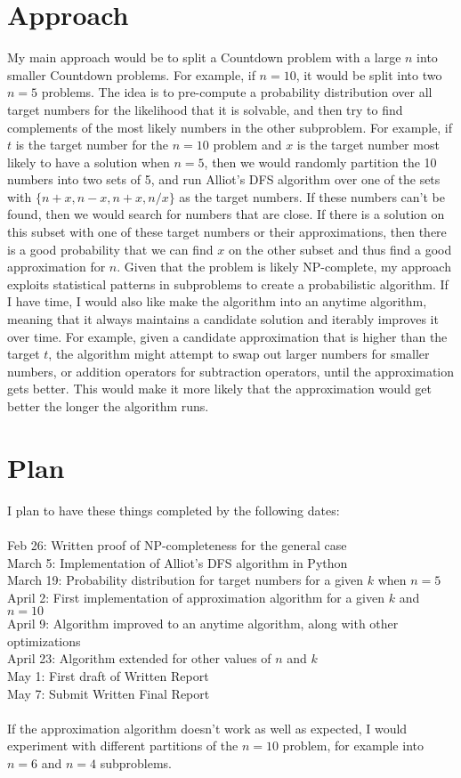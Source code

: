 \documentclass[12pt]{article}
\begin{document}
\section*{Approach}
My main approach would be to split a Countdown problem with a large $n$ into smaller Countdown problems. For example, if $n=10$, it would be split into two $n=5$ problems. The idea is to pre-compute a probability distribution over all target numbers for the likelihood that it is solvable, and then try to find complements of the most likely numbers in the other subproblem. For example, if $t$ is the target number for the $n=10$ problem and $x$ is the target number most likely to have a solution when $n=5$, then we would randomly partition the 10 numbers into two sets of 5, and run Alliot's DFS algorithm \cite{J-M Alliot} over one of the sets with $\{n+x, n-x, n+x, n/x\}$ as the target numbers. If these numbers can't be found, then we would search for numbers that are close. If there is a solution on this subset with one of these target numbers or their approximations, then there is a good probability that we can find $x$ on the other subset and thus find a good approximation for $n$. Given that the problem is likely NP-complete, my approach exploits statistical patterns in subproblems to create a probabilistic algorithm. If I have time, I would also like make the algorithm into an anytime algorithm, meaning that it always maintains a candidate solution and iterably improves it over time. For example, given a candidate approximation that is higher than the target $t$, the algorithm might attempt to swap out larger numbers for smaller numbers, or addition operators for subtraction operators, until the approximation gets better. This would make it more likely that the approximation would get better the longer the algorithm runs. 

\section*{Plan}
I plan to have these things completed by the following dates: \\ \\
Feb 26: Written proof of NP-completeness for the general case \\
March 5: Implementation of Alliot's DFS algorithm \cite{J-M Alliot} in Python\\
March 19: Probability distribution for target numbers for a given $k$ when $n=5$\\
April 2: First implementation of approximation algorithm for a given $k$ and $n=10$\\
April 9: Algorithm improved to an anytime algorithm, along with other optimizations\\
April 23: Algorithm extended for other values of $n$ and $k$\\
May 1: First draft of Written Report \\
May 7: Submit Written Final Report\\ \\
If the approximation algorithm doesn't work as well as expected, I would experiment with different partitions of the $n=10$ problem, for example into $n=6$ and $n=4$ subproblems.
\end{document}
